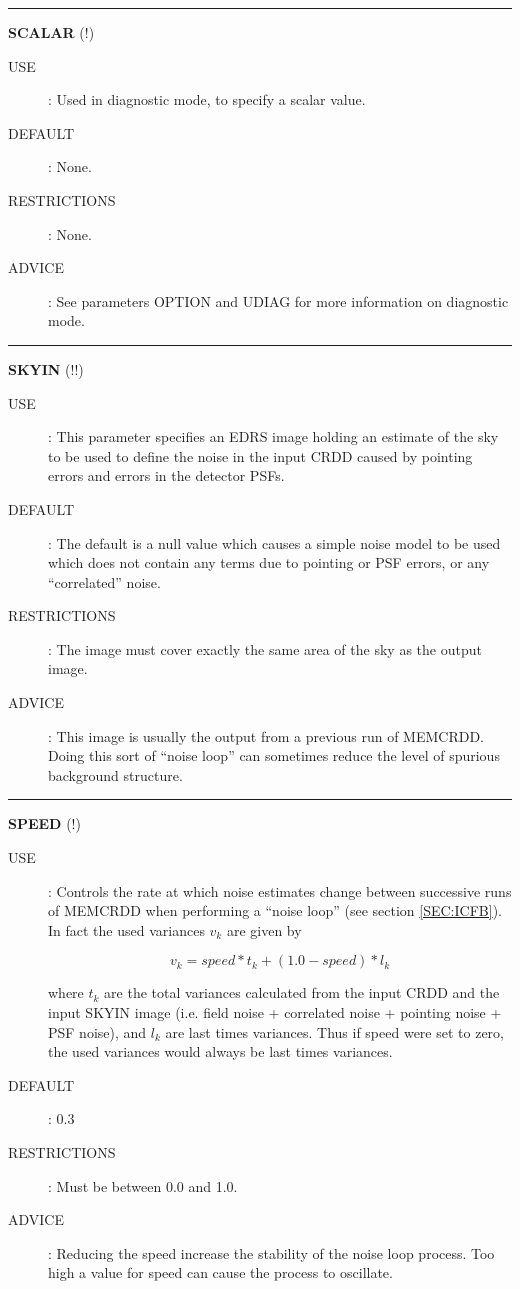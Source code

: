 \rule{\textwidth}{0.3mm}
{\Large {\bf SCALAR} (!)}
\begin{description}
\item [USE]:
Used in diagnostic mode, to specify a scalar value.
\item [DEFAULT]:
None.
\item [RESTRICTIONS]:
None.
\item [ADVICE]:
See parameters OPTION and UDIAG for more information on diagnostic mode.
\end {description}

\rule{\textwidth}{0.3mm}
{\Large {\bf SKYIN} (!!)}
\begin{description}
\item [USE]:
This parameter specifies an EDRS image holding an estimate of the sky to be
used to define the noise in the input CRDD caused by pointing errors and
 errors in the detector PSFs.
\item [DEFAULT]:
The default is a null value which causes a simple noise model to be used which
does not contain any terms due to pointing or PSF errors, or any ``correlated''
noise.
\item [RESTRICTIONS]:
The image must cover exactly the same area of the sky as the output image.
\item [ADVICE]:
This image is usually the output from a previous run of MEMCRDD. Doing this sort
of ``noise loop'' can sometimes reduce the level of spurious background
structure.
\end {description}

\rule{\textwidth}{0.3mm}
{\Large {\bf SPEED } (!)}
\begin{description}
\item [USE]:
Controls the rate at which noise estimates change between
successive runs of MEMCRDD when performing a ``noise loop'' (see section
\ref {SEC:ICFB}). In fact the used variances $v_{k}$ are given by

\begin {equation}
v_{k}=speed*t_{k}+(1.0-speed)*l_{k}
\end {equation}

where $t_{k}$ are the total variances calculated from the input CRDD and the
input SKYIN image (i.e. field noise + correlated noise + pointing noise + PSF
noise), and $l_{k}$ are last times variances. Thus if speed were set to zero,
the used variances would always be last times variances.
\item [DEFAULT]:
0.3
\item [RESTRICTIONS]:
Must be between 0.0 and 1.0.
\item [ADVICE]:
Reducing the speed increase the stability of the noise loop process. Too high a
value for speed can cause the process to oscillate.
\end {description}


